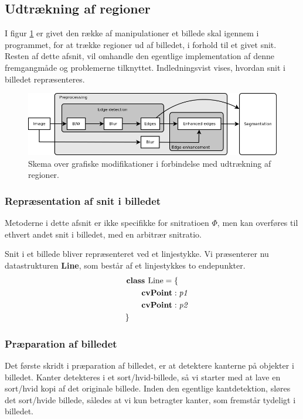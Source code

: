 {\subsection{Udtrækning af regioner}
I figur \ref{graphic_pipeline} er givet den række af manipulationer et billede
skal igennem i programmet, for at trække regioner ud af billedet, i
forhold til et givet snit. Resten af dette afsnit, vil omhandle den
egentlige implementation af denne fremgangmåde og problemerne
tilknyttet.  Indledningsvist vises, hvordan snit i billedet
repræsenteres.
\begin{figure}[!h]
    \includegraphics[width=\textwidth]{afsnit/implementation/billeder/billedbehandling/pipeline.png}
    \caption{Skema over grafiske modifikationer i forbindelse med
    udtrækning af regioner.}
    \label{graphic_pipeline}
\end{figure}

\subsubsection{Repræsentation af snit i billedet}
Metoderne i dette afsnit er ikke
specifikke for snitratioen $\varPhi$, men kan overføres til ethvert
andet snit i billedet, med en arbitrær snitratio.

Snit i et billede bliver repræsenteret ved et linjestykke. Vi
præsenterer nu datastrukturen \textbf{Line}, som består af et
linjestykkes to endepunkter.
\begin{multline}
    \textbf{class~} \textrm{Line} = \{ \\
    \shoveleft{\qquad\textbf{cvPoint} : \textit{p1}} \\
    \shoveleft{\qquad\textbf{cvPoint} : \textit{p2}} \\
    \shoveleft{\}}\shoveright{}
    \label{Line_class}
\end{multline}

\subsubsection{Præparation af billedet}
Det første skridt i præparation af billedet, er at detektere kanterne på
objekter i billedet.  Kanter detekteres i et sort/hvid-billede, så vi
starter med at lave en sort/hvid kopi af det originale billede. Inden
den egentlige kantdetektion, sløres det sort/hvide billede, således at
vi kun betragter kanter, som fremstår tydeligt i billedet.

}
